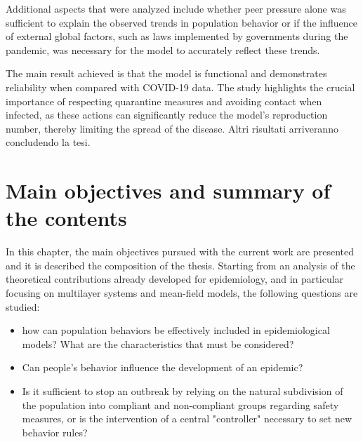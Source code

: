 Additional aspects that were analyzed include whether peer pressure alone was sufficient to explain the observed trends in population behavior or if the influence of external global factors, such as laws implemented by governments during the pandemic, was necessary for the model to accurately reflect these trends.

The main result achieved is that the model is functional and demonstrates reliability when compared with COVID-19 data. The study highlights the crucial importance of respecting quarantine measures and avoiding contact when infected, as these actions can significantly reduce the model's reproduction number, thereby limiting the spread of the disease. Altri risultati arriveranno concludendo la tesi.

\chapter{Main objectives and summary of the contents}

In this chapter, the main objectives pursued with the current work are presented and it is described the composition of the thesis. 
Starting from an analysis of the theoretical contributions already developed for epidemiology, and in particular focusing on multilayer systems and mean-field models, the following questions are studied:

\begin{itemize}
	\item how can population behaviors be effectively included in epidemiological models? What are the characteristics that must be considered?
	\item Can people's behavior influence the development of an epidemic?
	\item Is it sufficient to stop an outbreak by relying on the natural subdivision of the population into compliant and non-compliant groups regarding safety measures, or is the intervention of a central "controller" necessary to set new behavior rules?
\end{itemize}

